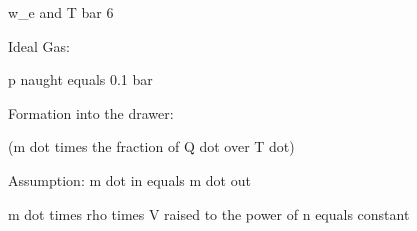 w_e and T bar 6

Ideal Gas:

p naught equals 0.1 bar

Formation into the drawer:

(m dot times the fraction of Q dot over T dot)

Assumption: m dot in equals m dot out

m dot times rho times V raised to the power of n equals constant
